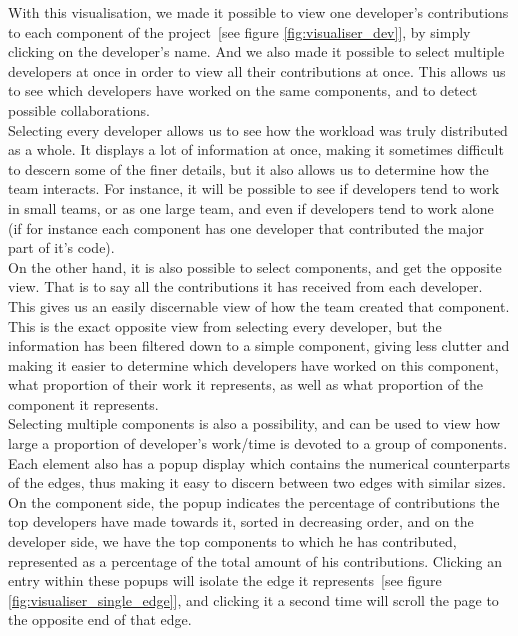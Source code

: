 With this visualisation, we made it possible to view one developer's contributions to each component of the project~[see figure \ref{fig:visualiser_dev}], by simply clicking on the developer's name. And we also made it possible to select multiple developers at once in order to view all their contributions at once. This allows us to see which developers have worked on the same components, and to detect possible collaborations.\\
Selecting every developer allows us to see how the workload was truly distributed as a whole. It displays a lot of information at once, making it sometimes difficult to descern some of the finer details, but it also allows us to determine how the team interacts.
For instance, it will be possible to see if developers tend to work in small teams, or as one large team, and even if developers tend to work alone (if for instance each component has one developer that contributed the major part of it's code).\\[0.3cm]

On the other hand, it is also possible to select components, and get the opposite view. That is to say all the contributions it has received from each developer. This gives us an easily discernable view of how the team created that component.  This is the exact opposite view from selecting every developer, but the information has been filtered down to a simple component, giving less clutter and making it easier to determine which developers have worked on this component, what proportion of their work it represents, as well as what proportion of the component it represents.\\
Selecting multiple components is also a possibility, and can be used to view how large a proportion of developer's work/time is devoted to a group of components.\\[0.3cm]

Each element also has a popup display which contains the numerical counterparts of the edges, thus making it easy to discern between two edges with similar sizes.
On the component side, the popup indicates the percentage of contributions the top developers have made towards it, sorted in decreasing order, and on the developer side, we have the top components to which he has contributed, represented as a percentage of the total amount of his contributions.
Clicking an entry within these popups will isolate the edge it represents~[see figure \ref{fig:visualiser_single_edge}], and clicking it a second time will scroll the page to the opposite end of that edge.